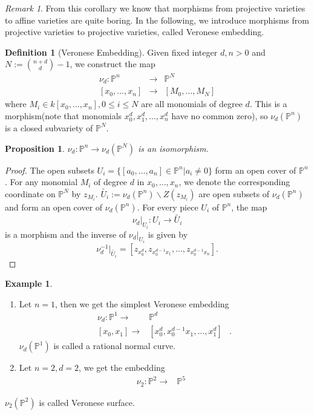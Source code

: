 \documentclass{amsart}
\theoremstyle{plain}
\newtheorem{proposition}{Proposition}
\theoremstyle{definition}
\newtheorem{definition}{Definition}
\newtheorem{example}{Example}
\theoremstyle{remark}
\newtheorem*{remark}{Remark}
\numberwithin{equation}{section}
\begin{document}
\begin{remark}
	From this corollary we know that morphisms from projective varieties to affine varieties are quite boring. In the following, we introduce morphisms from projective varieties to projective varieties, called Veronese embedding.
\end{remark}
\begin{definition}[Veronese Embedding]
	Given fixed integer $ d,n>0 $ and $ N:=\binom{n+d}{d}-1 $, we construct the map
	\begin{equation}
		\begin{array}{ccc}
		\nu_d:\mathbb{P}^n & \to & \mathbb{P}^N\\
		 {}[x_0,\dots,x_n] & \to & [ M_0,\dots,M_N ]
		\end{array}
	\end{equation}
	where $ M_i\in k[x_0,\dots,x_n], 0\leq i\leq N $ are all monomials of degree $ d $.
	This is a morphism(note that monomials $ x_0^d,x_1^d,\dots,x_n^d $ have no common zero), so $ \nu_d(\mathbb{P}^n) $ is a closed subvariety of $ \mathbb{P}^N $.  
\end{definition}
\begin{proposition}
	$ \nu_d:\mathbb{P}^n\to \nu_d(\mathbb{P}^N) $ is an isomorphism.
\end{proposition}
\begin{proof}
	The open subsets $ U_i=\{ [a_0,\dots,a_n]\in \mathbb{P}^n |a_i\neq 0 \} $ form an open cover of $ \mathbb{P}^n $. For any monomial $ M_i $ of degree $ d $ in $ x_0,\dots,x_n $, we denote the corresponding coordinate on $ \mathbb{P}^N $ by $ z_{M_i} $.  $ \tilde{U_i}:= \nu_d(\mathbb{P}^n)\backslash Z(z_{M_i}) $ are open subsets of $ \nu_d(\mathbb{P}^n) $ and form an open cover of $ \nu_d(\mathbb{P}^n) $. For every piece $ U_i $ of $ \mathbb{P}^n $, the map 
	$$
	\nu_d|_{U_i}:U_i\to \tilde{U_i}
	$$
	is a morphism and the inverse of $ \nu_d|_{U_i} $ is given by 
	$$
	\nu_d^{-1}|_{\tilde{U_i}}=[z_{x_0^d},z_{x_0^{d-1}x_1},\dots,z_{x_0^{d-1}x_n}].
	$$
\end{proof}
\begin{example}
	\noindent\begin{enumerate}
		\item Let $ n=1 $, then we get the simplest Veronese embedding
		$$
			\begin{array}{ccc}
			 \nu_d:\mathbb{P}^1  \to & \mathbb{P}^d & {}\\
			 {}[x_0,x_1]  \to &  [x_0^d,x_0^{d-1}x_1,\dots,x_1^d] & {}.
			\end{array}
		$$
		$ \nu_d(\mathbb{P}^1) $ is called a rational normal curve.
			\item Let $ n=2,d=2 $, we get the embedding
		$$
			\begin{array}{ccc}
			\nu_2:\mathbb{P}^2\to & \mathbb{P}^5 & {}
			\end{array}
		$$
	\end{enumerate}
	$ \nu_2(\mathbb{P}^2) $ is called Veronese surface.
\end{example}
\end{document}
